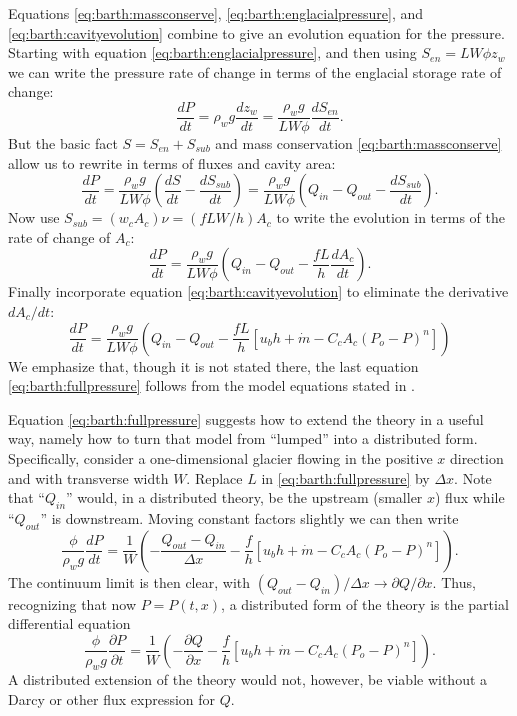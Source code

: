 \documentclass[11pt,final]{amsart}%
\begin{document}
Equations \eqref{eq:barth:massconserve}, \eqref{eq:barth:englacialpressure}, and \eqref{eq:barth:cavityevolution} combine to give an evolution equation for the pressure.  Starting with equation \eqref{eq:barth:englacialpressure}, and then using $S_{en}=L W \phi z_w$ we can write the pressure rate of change in terms of the englacial storage rate of change:
	$$\frac{dP}{dt} = \rho_w g \frac{dz_w}{dt} = \frac{\rho_w g}{L W \phi} \frac{d S_{en}}{dt}.$$
But the basic fact $S=S_{en}+S_{sub}$ and mass conservation \eqref{eq:barth:massconserve}  allow us to rewrite in terms of fluxes and cavity area:
    $$\frac{dP}{dt} = \frac{\rho_w g}{L W \phi} \left(\frac{d S}{dt} - \frac{d S_{sub}}{dt}\right) = \frac{\rho_w g}{L W \phi} \left(Q_{in} - Q_{out} - \frac{d S_{sub}}{dt}\right).$$
Now use $S_{sub} = (w_c A_c) \nu = (f L W/h) A_c$ to write the evolution in terms of the rate of change of $A_c$:
    $$\frac{dP}{dt} = \frac{\rho_w g}{L W \phi} \left(Q_{in} - Q_{out} - \frac{f L }{h} \frac{d A_c}{dt}\right).$$
Finally incorporate equation \eqref{eq:barth:cavityevolution} to eliminate the derivative $dA_c/dt$:
\begin{equation}
\frac{dP}{dt} = \frac{\rho_w g}{L W \phi} \left(Q_{in} - Q_{out} - \frac{f L }{h} \left[u_b h + \dot m - C_c A_c (P_o-P)^n\right]\right)  \label{eq:barth:fullpressure}
\end{equation}
We emphasize that, though it is not stated there, the last equation \eqref{eq:barth:fullpressure} follows from the model equations stated in \cite{Bartholomausetal2011}.

Equation \eqref{eq:barth:fullpressure} suggests how to extend the \cite{Bartholomausetal2011} theory in a useful way, namely how to turn that model from ``lumped'' into a distributed form.  Specifically, consider a one-dimensional glacier flowing in the positive $x$ direction and with transverse width $W$.  Replace $L$ in \eqref{eq:barth:fullpressure} by $\Delta x$.  Note that ``$Q_{in}$'' would, in a distributed theory, be the upstream (smaller $x$) flux while ``$Q_{out}$'' is downstream.  Moving constant factors slightly we can then write
\begin{equation*}
\frac{\phi}{\rho_w g}\frac{dP}{dt} = \frac{1}{W} \left(- \frac{Q_{out} - Q_{in}}{\Delta x} - \frac{f}{h} \left[u_b h + \dot m - C_c A_c (P_o-P)^n\right]\right).
\end{equation*}
The continuum limit is then clear, with $(Q_{out} - Q_{in})/\Delta x \to \partial Q/\partial x$.  Thus, recognizing that now $P=P(t,x)$, a distributed form of the \cite{Bartholomausetal2011} theory is the partial differential equation
\begin{equation}
\frac{\phi}{\rho_w g} \frac{\partial P}{\partial t} = \frac{1}{W} \left(- \frac{\partial Q}{\partial x} - \frac{f}{h} \left[u_b h + \dot m - C_c A_c (P_o-P)^n\right]\right).  \label{eq:barth:distpressure}
\end{equation}
A distributed extension of the \cite{Bartholomausetal2011} theory would not, however, be viable without a Darcy or other flux expression for $Q$.
\end{document}

